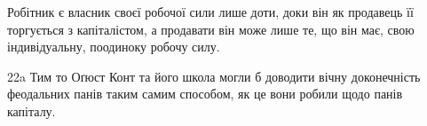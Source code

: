 Робітник є власник своєї робочої сили лише доти, доки він
як продавець її торгується з капіталістом, а продавати він може
лише те, що він має, свою індивідуальну, поодиноку робочу силу.

22a Тим то Оґюст Конт та його школа могли б доводити вічну доконечність
феодальних панів таким самим способом, як це вони робили
щодо панів капіталу.
\parbreak{}  %
